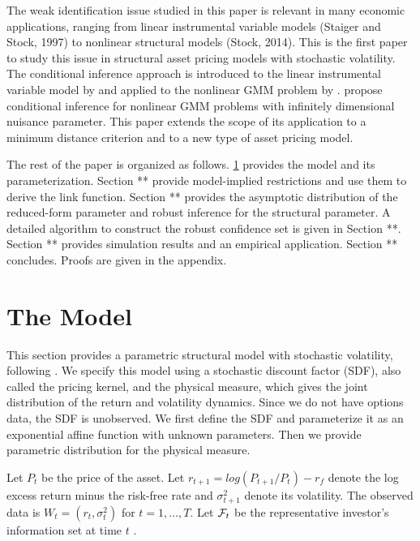 \documentclass[11pt, letterpaper, twoside]{article}
\begin{document}
The weak identification issue studied in this paper is relevant in many economic applications, ranging from linear instrumental variable models (Staiger and Stock, 1997) to nonlinear structural models \parencites{mavroeidis2014empirical, andrews2015maximum}  (Stock, 2014). This is the first paper to study this issue in structural asset pricing models with stochastic volatility. The conditional inference approach is introduced to the linear instrumental variable model by \textcite{moreira2003conditional} and applied to the nonlinear GMM problem by \textcite{kleibergen2005testing}. \Textcite{andrews2016conditional} propose conditional inference for nonlinear GMM problems with infinitely dimensional nuisance parameter. This paper extends the scope of its application to a minimum distance criterion and to a new type of asset pricing model.

The rest of the paper is organized as follows. \cref{sec:model} provides the model and its parameterization. Section ** provide model-implied restrictions and use them to derive the link function. Section ** provides the asymptotic distribution of the reduced-form parameter and robust inference for the structural parameter. A detailed algorithm to construct the robust confidence set is given in Section **. Section ** provides simulation results and an empirical application. Section ** concludes. Proofs are given in the appendix.

\section{The Model}\label{sec:model}


This section provides a parametric structural model with stochastic volatility, following \textcite{han2018leverage}. We specify this model using a stochastic discount factor (SDF), also called the pricing kernel, and the physical measure, which gives the joint distribution of the return and volatility dynamics. Since we do not have options data, the SDF is unobserved. We first define the SDF and parameterize it as an exponential affine function with unknown parameters. Then we provide parametric distribution for the physical measure. 

  
Let $P_t$ be the price of the asset. Let $r_{t+1}=log(P_{t+1}/P_t)-r_f$ denote the log excess return minus the risk-free rate and $\sigma^2_{t+1}$ denote its volatility. The observed data is $W_t=(r_t,\sigma^2_{t})$ for $t=1,...,T$. 
Let $\mathcal{F}_t$ be the representative investor's information set at time $t$ . 
\end{document}
